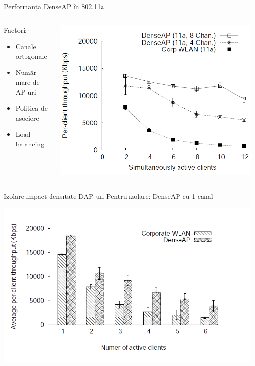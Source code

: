 \begin{frame}{Performanța DenseAP în 802.11a}
  \begin{columns}
  \begin{column}{0.45\linewidth}
    Factori:
    \begin{itemize}
      \item Canale ortogonale
      \item Număr mare de AP-uri
      \item Politica de asociere
      \item Load balancing
    \end{itemize}
  \end{column}
  \begin{column}{0.55\linewidth}
    \includegraphics[scale=0.25]{img/fig10.png}
  \end{column}
  \end{columns}
\end{frame}

\begin{frame}{Izolare impact densitate DAP-uri}
  Pentru izolare: DenseAP cu 1 canal
  \begin{center}
    \includegraphics[scale=0.4]{img/fig12.png}
  \end{center}
\end{frame}

